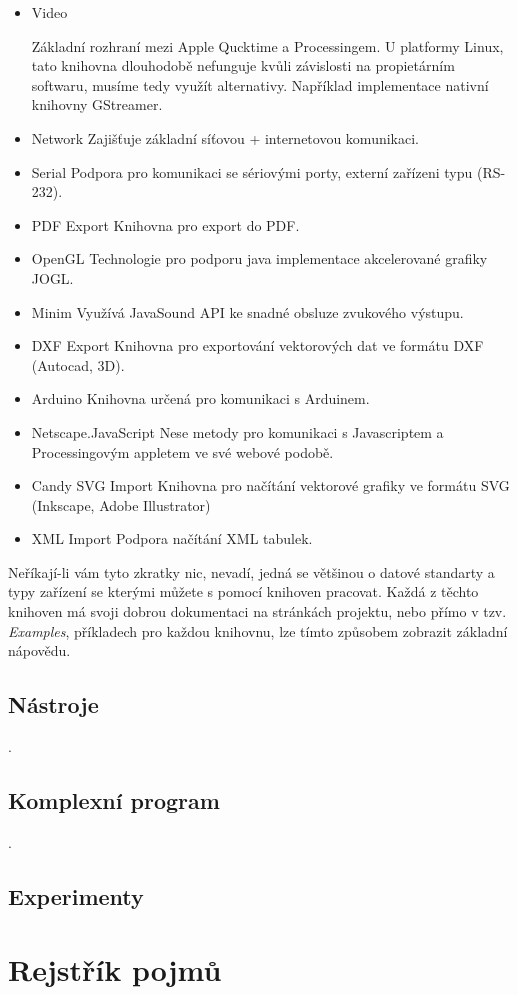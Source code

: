 \documentclass[11pt]{book}
\newcommand{\oddil}[1]{\section{#1}\label{sec:#1}}
\begin{document}
\begin{itemize}
\item
Video

Základní rozhraní mezi Apple Qucktime a Processingem. U platformy Linux, tato knihovna dlouhodobě nefunguje kvůli závislosti na propietárním softwaru, musíme tedy využít alternativy. Například implementace nativní knihovny GStreamer.

\item
Network
Zajišťuje základní síťovou + internetovou komunikaci. 

\item
Serial
Podpora pro komunikaci se sériovými porty, externí zařízeni typu (RS-232).

\item
PDF Export
Knihovna pro export do PDF.

\item
OpenGL
Technologie pro podporu java implementace akcelerované grafiky JOGL.

\item
Minim
Využívá JavaSound API ke snadné obsluze zvukového výstupu.

\item
DXF Export
Knihovna pro exportování vektorových dat ve formátu DXF (Autocad, 3D).

\item
Arduino
Knihovna určená pro komunikaci s Arduinem.

\item
Netscape.JavaScript
Nese metody pro komunikaci s Javascriptem a Processingovým appletem ve své webové podobě.

\item
Candy SVG Import
Knihovna pro načítání vektorové grafiky ve formátu SVG (Inkscape, Adobe Illustrator)

\item
XML Import
Podpora načítání XML tabulek.
\end{itemize}

Neříkají-li vám tyto zkratky nic, nevadí, jedná se většinou o datové standarty a typy zařízení se kterými můžete s pomocí knihoven pracovat. Každá z těchto knihoven má svoji dobrou dokumentaci na stránkách projektu, nebo přímo v tzv. {\em Examples}, příkladech pro každou knihovnu, lze tímto způsobem zobrazit základní nápovědu.






\oddil{Nástroje}
.
\newpage
\oddil{Komplexní program}
.
\newpage
\oddil{Experimenty}


\chapter{Rejstřík pojmů}
\printglossaries
\printindex


\end{document}
